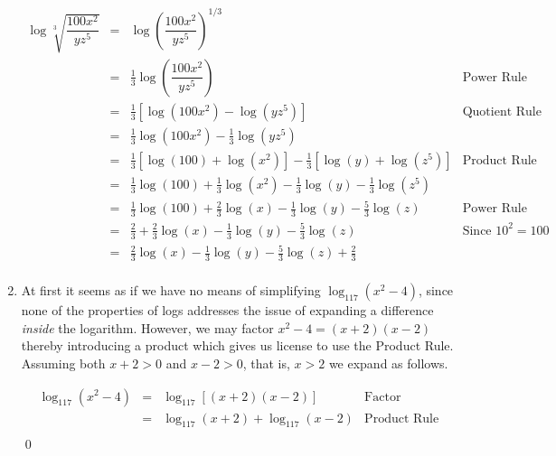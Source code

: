 \begin{ex}
\begin{enumerate}
\[\begin{array}{rclr}
\log \sqrt[3]{\dfrac{100 x^2}{yz^5}} & = & \log \left(\dfrac{100 x^2}{yz^5}\right)^{1/3} & \\ [10pt]
																		& = & \frac{1}{3} \log\left(\dfrac{100 x^2}{yz^5}\right) & \mbox{Power Rule} \\ [5pt]
																		& = & \frac{1}{3} \left[ \log\left(100x^2\right) - \log\left(yz^5\right) \right] & \mbox{Quotient Rule} \\ 
																		& = & \frac{1}{3}\log\left(100x^2\right) - \frac{1}{3}\log\left(yz^5\right) & \\
																		& = & \frac{1}{3}\left[ \log(100) + \log\left(x^2\right)\right] - \frac{1}{3} \left[ \log(y) + \log\left(z^5\right) \right] & \mbox{Product Rule} \\
																		& = & \frac{1}{3} \log(100) + \frac{1}{3} \log\left(x^2\right) - \frac{1}{3} \log(y) - \frac{1}{3} \log\left(z^5\right) \\
																		& = & \frac{1}{3} \log(100) + \frac{2}{3} \log(x) - \frac{1}{3} \log(y) - \frac{5}{3} \log(z) & \mbox{Power Rule} \\
																		& = & \frac{2}{3} + \frac{2}{3} \log(x) - \frac{1}{3} \log(y) - \frac{5}{3} \log(z) & \mbox{Since $10^2=100$} \\
																		& = &  \frac{2}{3} \log(x) - \frac{1}{3} \log(y) - \frac{5}{3} \log(z) + \frac{2}{3} & \\


\end{array} \]
\setlength{\extrarowheight}{2pt}

\item  At first it seems as if we have no means of simplifying $\log_{117}\left(x^2-4\right)$, since none of the properties of logs addresses the issue of expanding a difference \textit{inside} the logarithm.  However, we may factor $x^2 - 4 = (x+2)(x-2)$ thereby introducing a product which gives us license to use the Product Rule.  Assuming both $x+2>0$ and $x-2>0$, that is, $x >2$  we expand as follows.

\setlength{\extrarowheight}{4pt}
\[ \begin{array}{rclr}

\log_{117}\left(x^2-4\right) & = & \log_{117} \left[(x+2)(x-2)\right] & \mbox{Factor} \\
														 & = & \log_{117}(x+2) + \log_{117}(x-2) & \mbox{Product Rule} \\
\end{array}\]
\setlength{\extrarowheight}{2pt}
\qed

\end{enumerate}

\end{ex}

